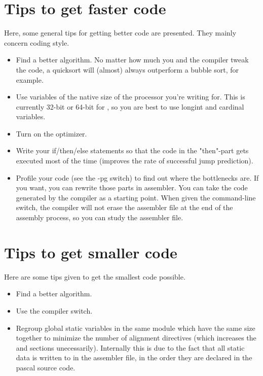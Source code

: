 {\section{Tips to get faster code}
Here, some general tips for getting better code are presented. They
mainly concern coding style.

\begin{itemize}
\item Find a better algorithm. No matter how much you and the compiler
tweak the code, a quicksort will (almost) always outperform a bubble
sort, for example.

\item Use variables of the native size of the processor you're writing
for. This is currently 32-bit or 64-bit for \fpc, so you are best to
use longint and cardinal variables.

\item Turn on the optimizer.

\item Write your if/then/else statements so that the code in the "then"-part
gets executed most of the time (improves the rate of successful jump prediction).

\item Profile your code (see the -pg switch) to find out where the
bottlenecks are. If you want, you can rewrite those parts in assembler.
You can take the code generated by the compiler as a starting point. When
given the  command-line switch, the compiler will not erase the
assembler file at the end of the assembly process, so you can study the
assembler file.

\end{itemize}

\section{Tips to get smaller code}
Here are some tips given to get the smallest code possible.

\begin{itemize}

\item Find a better algorithm.

\item Use the  compiler switch.

\item Regroup global static variables in the same module which have the same
 size together to minimize the number of alignment directives (which increases
 the  and  sections unecessarily). Internally this is
 due to the fact that all static data is written to in the assembler file,
 in the order they are declared in the pascal source code.


\end{itemize}}
